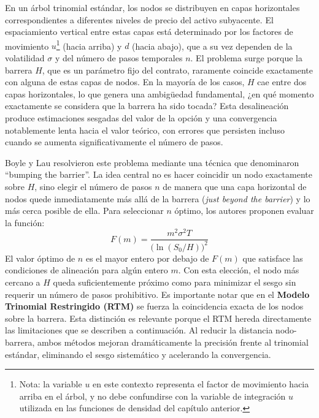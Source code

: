 En un árbol trinomial estándar, los nodos se distribuyen en capas horizontales correspondientes a diferentes niveles de precio del activo subyacente. El espaciamiento vertical entre estas capas está determinado por los factores de movimiento $u$\footnote{Nota: la variable $u$ en este contexto representa el factor de movimiento hacia arriba en el árbol, y no debe confundirse con la variable de integración $u$ utilizada en las funciones de densidad del capítulo anterior.} (hacia arriba) y $d$ (hacia abajo), que a su vez dependen de la volatilidad $\sigma$ y del número de pasos temporales $n$. El problema surge porque la barrera $H$, que es un parámetro fijo del contrato, raramente coincide exactamente con alguna de estas capas de nodos. En la mayoría de los casos, $H$ cae entre dos capas horizontales, lo que genera una ambigüedad fundamental, ¿en qué momento exactamente se considera que la barrera ha sido tocada? Esta desalineación produce estimaciones sesgadas del valor de la opción y una convergencia notablemente lenta hacia el valor teórico, con errores que persisten incluso cuando se aumenta significativamente el número de pasos.

Boyle y Lau resolvieron este problema mediante una técnica que denominaron ``bumping the barrier''. La idea central no es hacer coincidir un nodo exactamente sobre $H$, sino elegir el número de pasos $n$ de manera que una capa horizontal de nodos quede inmediatamente más allá de la barrera (\textit{just beyond the barrier}) y lo más cerca posible de ella. Para seleccionar $n$ óptimo, los autores proponen evaluar la función:
\begin{equation}
F(m) = \frac{m^2 \sigma^2 T}{\bigl(\ln(S_0/H)\bigr)^2}
\end{equation}
El valor óptimo de $n$ es el mayor entero por debajo de $F(m)$ que satisface las condiciones de alineación para algún entero $m$. Con esta elección, el nodo más cercano a $H$ queda suficientemente próximo como para minimizar el sesgo sin requerir un número de pasos prohibitivo. Es importante notar que en el \textbf{Modelo Trinomial Restringido (RTM)} se fuerza la coincidencia exacta de los nodos sobre la barrera. Esta distinción es relevante porque el RTM hereda directamente las limitaciones que se describen a continuación. Al reducir la distancia nodo-barrera, ambos métodos mejoran dramáticamente la precisión frente al trinomial estándar, eliminando el sesgo sistemático y acelerando la convergencia.

